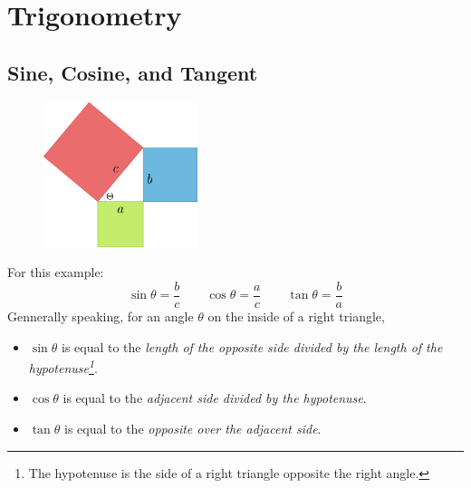 \chapter{Trigonometry}

\section{Sine, Cosine, and Tangent}
\begin{figure}[H]
  \begin{center}
    \includegraphics[width=0.4\textwidth]{continuous/trig/basictrig}
  \end{center}
\end{figure}

For this example:
  \[\displaystyle{\sin\theta=\frac{b}{c}}\qquad
  \displaystyle{\cos\theta=\frac{a}{c}}\qquad
  \displaystyle{\tan\theta=\frac{b}{a}}\]
Gennerally speaking, for an angle $\theta$ on the inside of a right triangle,
\begin{itemize}
  \item$\sin\theta$ is equal to the \emph{length of the opposite side divided by the length of the hypotenuse\footnote{The hypotenuse is the side of a right triangle opposite the right angle.}}.
  \item$\cos\theta$ is equal to the \emph{adjacent side divided by the hypotenuse}.
  \item$\tan\theta$ is equal to the \emph{opposite over the adjacent side}.
\end{itemize}



